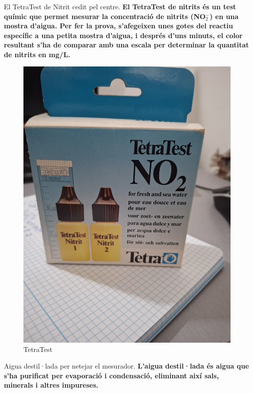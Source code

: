 \begin{enumerate}
\begin{minipage}[h]{0.6\textwidth}
\item El TetraTest de Nitrit cedit pel centre. \textbf{El TetraTest de nitrits és un test químic que permet mesurar la concentració de nitrits (NO$_2^-$) en una mostra d’aigua. Per fer la prova, s’afegeixen unes gotes del reactiu específic a una petita mostra d’aigua, i després d’uns minuts, el color resultant s’ha de comparar amb una escala per determinar la quantitat de nitrits en mg/L.}
\end{minipage}
\begin{minipage}[h]{0.35\textwidth}
\begin{figure}[H]
\centering
\includegraphics[width=1\textwidth, angle=270]{./Figures/TetraTest.png}
\caption{TetraTest}
\label{fig:TetraTestdeNitrit}
\end{figure}
\end{minipage}

 \item Aigua destil·lada per netejar el mesurador. \textbf{L’aigua destil·lada és aigua que s’ha purificat per evaporació i condensació, eliminant així sals, minerals i altres impureses.}


\end{enumerate}
